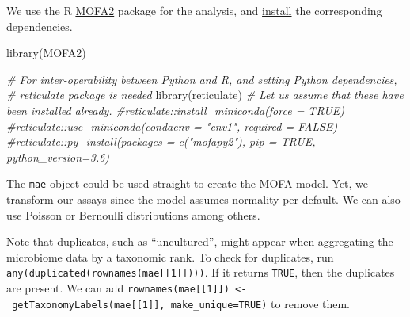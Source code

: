\documentclass[
]{book}
\newenvironment{Shaded}{\begin{snugshade}}{\end{snugshade}}
\newcommand{\CommentTok}[1]{\textcolor[rgb]{0.56,0.35,0.01}{\textit{#1}}}
\newcommand{\FunctionTok}[1]{\textcolor[rgb]{0.00,0.00,0.00}{#1}}
\newcommand{\NormalTok}[1]{#1}
\begin{document}
We use the R \href{https://biofam.github.io/MOFA2/index.html}{MOFA2}
package for the analysis, and
\href{https://biofam.github.io/MOFA2/installation.html}{install} the
corresponding dependencies.

\begin{Shaded}
\begin{Highlighting}[]
\FunctionTok{library}\NormalTok{(MOFA2)}

\CommentTok{\# For inter{-}operability between Python and R, and setting Python dependencies,}
\CommentTok{\# reticulate package is needed}
\FunctionTok{library}\NormalTok{(reticulate)}
\CommentTok{\# Let us assume that these have been installed already.}
\CommentTok{\#reticulate::install\_miniconda(force = TRUE)}
\CommentTok{\#reticulate::use\_miniconda(condaenv = "env1", required = FALSE)}
\CommentTok{\#reticulate::py\_install(packages = c("mofapy2"), pip = TRUE, python\_version=3.6)}
\end{Highlighting}
\end{Shaded}

The \texttt{mae} object could be used straight to create the MOFA model. Yet,
we transform our assays since the model assumes normality per
default. We can also use Poisson or Bernoulli distributions among others.

Note that duplicates, such as ``uncultured'', might appear when aggregating the microbiome data by a taxonomic rank. To check for duplicates, run \texttt{any(duplicated(rownames(mae{[}{[}1{]}{]})))}. If it returns \texttt{TRUE}, then the
duplicates are present. We can add \texttt{rownames(mae{[}{[}1{]}{]})\ \textless{}-\ getTaxonomyLabels(mae{[}{[}1{]}{]},\ make\_unique=TRUE)} to remove them.
\end{document}
